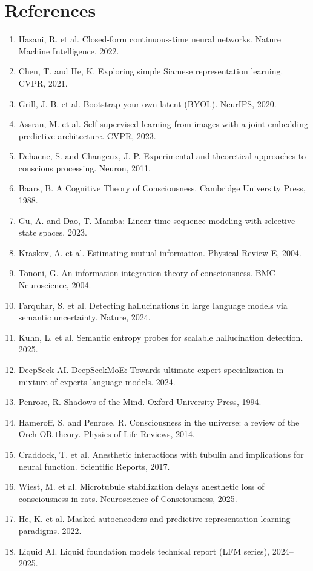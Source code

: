 \documentclass[10pt,twocolumn]{article}
\begin{document}
\section*{References}
\begin{enumerate}
\item Hasani, R. et al. Closed-form continuous-time neural networks. Nature Machine Intelligence, 2022.
\item Chen, T. and He, K. Exploring simple Siamese representation learning. CVPR, 2021.
\item Grill, J.-B. et al. Bootstrap your own latent (BYOL). NeurIPS, 2020.
\item Assran, M. et al. Self-supervised learning from images with a joint-embedding predictive architecture. CVPR, 2023.
\item Dehaene, S. and Changeux, J.-P. Experimental and theoretical approaches to conscious processing. Neuron, 2011.
\item Baars, B. A Cognitive Theory of Consciousness. Cambridge University Press, 1988.
\item Gu, A. and Dao, T. Mamba: Linear-time sequence modeling with selective state spaces. 2023.
\item Kraskov, A. et al. Estimating mutual information. Physical Review E, 2004.
\item Tononi, G. An information integration theory of consciousness. BMC Neuroscience, 2004.
\item Farquhar, S. et al. Detecting hallucinations in large language models via semantic uncertainty. Nature, 2024.
\item Kuhn, L. et al. Semantic entropy probes for scalable hallucination detection. 2025.
\item DeepSeek-AI. DeepSeekMoE: Towards ultimate expert specialization in mixture-of-experts language models. 2024.
\item Penrose, R. Shadows of the Mind. Oxford University Press, 1994.
\item Hameroff, S. and Penrose, R. Consciousness in the universe: a review of the Orch OR theory. Physics of Life Reviews, 2014.
\item Craddock, T. et al. Anesthetic interactions with tubulin and implications for neural function. Scientific Reports, 2017.
\item Wiest, M. et al. Microtubule stabilization delays anesthetic loss of consciousness in rats. Neuroscience of Consciousness, 2025.
\item He, K. et al. Masked autoencoders and predictive representation learning paradigms. 2022.
\item Liquid AI. Liquid foundation models technical report (LFM series), 2024--2025.
\end{enumerate}
\end{document}
